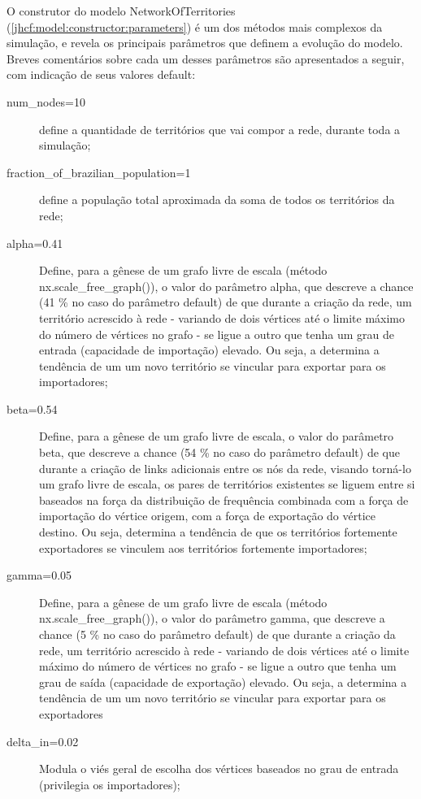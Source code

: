 O construtor do modelo NetworkOfTerritories (\ref{jhcf:model:constructor:parameters}) é um dos métodos mais complexos da simulação, e revela os principais parâmetros que definem a evolução do modelo. Breves comentários sobre cada um desses parâmetros são apresentados a seguir, com indicação de seus valores default:
\begin{description}

\item [num\_nodes=10] define a quantidade de territórios que vai compor a rede, durante toda a simulação;
\item [fraction\_of\_brazilian\_population=1] define a população total aproximada da soma de todos os territórios da rede;
\item[alpha=0.41] Define, para a gênese de um grafo livre de escala (método nx.scale\_free\_graph()), o valor do parâmetro alpha, que descreve a chance (41 \% no caso do parâmetro default) de que durante a criação da rede, um território acrescido à rede - variando de dois vértices até o limite máximo do número de vértices no grafo - se ligue a outro que tenha um grau de entrada (capacidade de importação) elevado. Ou seja, a determina a tendência de um um novo território se vincular para exportar para os importadores;
\item [beta=0.54] Define, para a gênese de um grafo livre de escala, o valor do parâmetro beta, que descreve a chance (54 \% no caso do parâmetro default) de que durante a criação de links adicionais entre os nós da rede, visando torná-lo um grafo livre de escala, os pares de territórios existentes se liguem entre si baseados na força da distribuição de frequência combinada com a força de importação do vértice origem, com a força de exportação do vértice destino. Ou seja, determina a tendência de que os territórios fortemente exportadores se vinculem aos territórios fortemente importadores;
\item [gamma=0.05] Define, para a gênese de um grafo livre de escala (método nx.scale\_free\_graph()), o valor do parâmetro gamma, que descreve a chance (5 \% no caso do parâmetro default) de que durante a criação da rede, um território acrescido à rede - variando de dois vértices até o limite máximo do número de vértices no grafo - se ligue a outro que tenha um grau de saída (capacidade de exportação) elevado. Ou seja, a determina a tendência de um um novo território se vincular para exportar para os exportadores
\item [delta\_in=0.02] Modula o viés geral de escolha dos vértices baseados no grau de entrada (privilegia os importadores);

\end{description}
